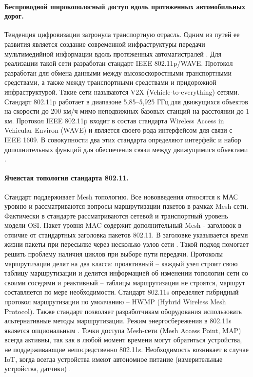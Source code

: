 \paragraph{Беспроводной широкополосный доступ вдоль протяженных автомобильных дорог.}
Тенденция цифровизации затронула транспортную отрасль. Одним из путей ее развития является создание современной инфраструктуры передачи мультимедийной информации вдоль протяженных автомагистралей \cite{Vish2015}. Для реализации такой сети разработан стандарт IEEE 802.11p/WAVE. Протокол разработан для обмена данными между высокоскоростными транспортными средствами, а также между транспортными средствами и придорожной инфраструктурой. Такие сети называются V2X (Vehicle-to-everything) сетями. Стандарт 802.11p работает в диапазоне 5,85–5,925 ГГц для движущихся объектов на скорости до 200 км/ч мимо неподвижных базовых станций на расстоянии до 1 км. Протокол IEEE 802.11p входит в состав стандарта Wireless Access in Vehicular Environ (WAVE) и является своего рода интерфейсом для связи с IEEE 1609. В совокупности два этих стандарта определяют интерфейс и набор дополнительных функций для обеспечения связи между движущимися объектами \cite{IEEE802.11p}.

\paragraph{Ячеистая топология стандарта 802.11.} Стандарт поддерживает Mesh топологию. Все нововведения относятся к МАС уровню и рассматриваются вопросы маршрутизации пакетов в рамках Mesh-сети. Фактически в стандарте рассматриваются сетевой и транспортный уровень модели OSI. Пакет уровня MAC содержит дополнительный Mesh - заголовок в отличие от стандартных заголовка пакетов 802.11. В заголовке указывается время жизни пакеты при пересылке через несколько узлов сети \cite{Vishnevsky2009}. Такой подход помогает решить проблему наличия циклов при выборе пути передачи. Протоколы маршрутизации делят на два класса: проактивный -- каждый узел строит свою таблицу маршрутизации и делится информацией об изменении топологии сети со своими соседями и реактивный --  таблицы маршрутизации не строятся, маршрут составляется по мере необходимости. Стандарт 802.11s определяет гибридный протокол маршрутизации по умолчанию -- HWMP (Hybrid Wireless Mesh Protocol). Также стандарт позволяет разработчикам оборудования использовать альтернативные методы маршрутизации. Режим энергосбережения в 802.11s является опциональным \cite{802.11WG-WirelessLANWorkingGroup2020}. Точки доступа Mesh-сети (Mesh Access Point, MAP) всегда активны, так как в любой момент времени могут обратиться устройства, не поддерживающие непосредственно 802.11s. Необходимость возникает в случае IoT, когда всегда устройства имеют автономное питание (измерительные устройства, датчики) \cite{Vishnevsky2009}.


